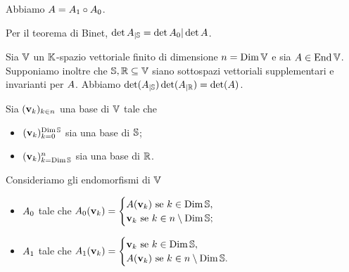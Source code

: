 Abbiamo
$A = A_1 \circ A_0$.
\par Per il teorema di Binet,
$\operatorname{det}{{A}_{|\mathbb{S}}}
= \operatorname{det}{A_0} | \operatorname{det}{A}$.
\EndProof
\begin{Corollary}
  Sia $\mathbb{V}$ un $\mathbb{K}$-spazio vettoriale finito di dimensione
  $n = \operatorname{\operatorname{Dim}}{\mathbb{V}}$ e sia
  $A \in \operatorname{End}{\mathbb{V}}$.
  Supponiamo inoltre che
  $\mathbb{S}, \mathbb{R} \subseteq \mathbb{V}$
  siano sottospazi vettoriali supplementari e invarianti per
  $A$.
  Abbiamo
  $\operatorname{det}({A}_{|\mathbb{S}})
  \operatorname{det}({A}_{|\mathbb{R}})
  = \operatorname{det}(A)$.
\end{Corollary}
\Proof Sia
$(\mathbf{v}_k)_{k \in n}$
una base di $\mathbb{V}$ tale che
\begin{itemize}
  \item $(\mathbf{v}_k)_{k = 0}^{\operatorname{Dim}{\mathbb{S}}}$
    sia una base di $\mathbb{S}$;
  \item $(\mathbf{v}_k)_{k = \operatorname{Dim}{\mathbb{S}}}^n$
    sia una base di $\mathbb{R}$.
\end{itemize}
\par Consideriamo gli endomorfismi di $\mathbb{V}$
\begin{itemize}
  \item $A_0$ tale che
    $A_0(\mathbf{v}_k) =
      \begin{cases}
        A(\mathbf{v}_k)\text{ se }
          k \in \operatorname{Dim}{\mathbb{S}},\\
        \mathbf{v}_k\text{ se }
          k \in n \setminus \operatorname{Dim}{\mathbb{S}};
      \end{cases}$
  \item $A_1$ tale che
    $A_1(\mathbf{v}_k) =
      \begin{cases}
        \mathbf{v}_k\text{ se }
          k \in \operatorname{Dim}{\mathbb{S}},\\
        A(\mathbf{v}_k)\text{ se }
          k \in n \setminus \operatorname{Dim}{\mathbb{S}}.
      \end{cases}$
\end{itemize}
